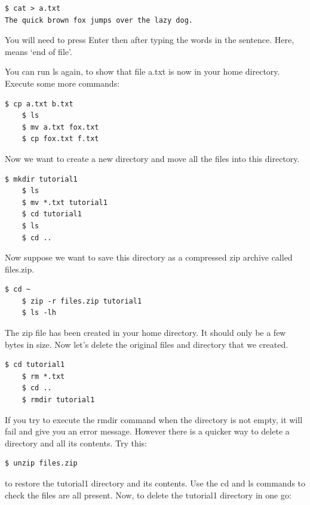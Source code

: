 \documentclass{article}
\begin{document}
\begin{lstlisting}[style=BashInputStyle]
    $ cat > a.txt
The quick brown fox jumps over the lazy dog.
\end{lstlisting}

You will need to press Enter then  after typing the words in the sentence. Here,  means `end of file'.

You can run ls again, to show that file a.txt is now in your home directory. Execute some more commands:

\begin{lstlisting}[style=BashInputStyle]
    $ cp a.txt b.txt
    $ ls
    $ mv a.txt fox.txt
    $ cp fox.txt f.txt
\end{lstlisting}

Now we want to create a new directory and move all the files into this directory.

\begin{lstlisting}[style=BashInputStyle]
    $ mkdir tutorial1
    $ ls
    $ mv *.txt tutorial1
    $ cd tutorial1
    $ ls
    $ cd ..
\end{lstlisting}

Now suppose we want to save this directory as a compressed zip archive called files.zip.

\begin{lstlisting}[style=BashInputStyle]
    $ cd ~
    $ zip -r files.zip tutorial1 
    $ ls -lh    
\end{lstlisting}

The zip file has been created in your home directory. It should only be a few bytes in size. Now let's delete the original files and directory that we created.

\begin{lstlisting}[style=BashInputStyle]
    $ cd tutorial1
    $ rm *.txt
    $ cd ..
    $ rmdir tutorial1  
\end{lstlisting}


If you try to execute the rmdir command when the directory is not empty, it will fail and give you an error message. However there is a quicker way to delete a directory and all its contents. Try this:

\begin{lstlisting}[style=BashInputStyle]
    $ unzip files.zip
\end{lstlisting}

to restore the tutorial1 directory and its contents. Use the cd and ls commands to check the files are all present. Now, to delete the tutorial1 directory in one go:
\end{document}
